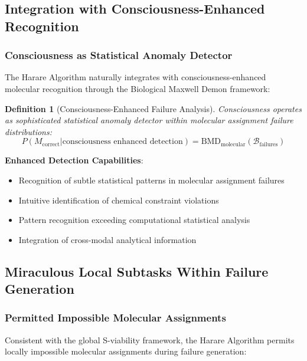 \documentclass[11pt,a4paper]{article}
\newtheorem{definition}[theorem]{Definition}
\theoremstyle{remark}
\begin{document}
{{\subsection{Integration with Consciousness-Enhanced Recognition}

\subsubsection{Consciousness as Statistical Anomaly Detector}

The Harare Algorithm naturally integrates with consciousness-enhanced molecular recognition through the Biological Maxwell Demon framework:

\begin{definition}[Consciousness-Enhanced Failure Analysis]
Consciousness operates as sophisticated statistical anomaly detector within molecular assignment failure distributions:
$$P(M_{\text{correct}} | \text{consciousness enhanced detection}) = \text{BMD}_{\text{molecular}}(\mathcal{B}_{\text{failures}})$$
\end{definition}

\textbf{Enhanced Detection Capabilities}:
\begin{itemize}
\item Recognition of subtle statistical patterns in molecular assignment failures
\item Intuitive identification of chemical constraint violations
\item Pattern recognition exceeding computational statistical analysis
\item Integration of cross-modal analytical information
\end{itemize}

\subsection{Miraculous Local Subtasks Within Failure Generation}

\subsubsection{Permitted Impossible Molecular Assignments}

Consistent with the global S-viability framework, the Harare Algorithm permits locally impossible molecular assignments during failure generation:

}}
\end{document}
